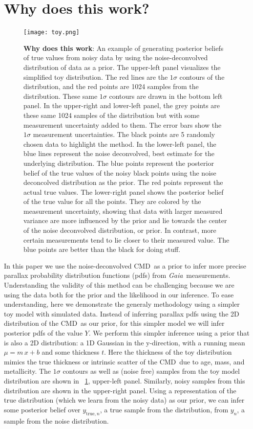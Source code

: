 \documentclass[modern]{aastex61}
\newcommand{\acronym}[1]{{\small{#1}}}
\newcommand{\project}[1]{\textsl{#1}}
\newcommand{\gaia}{\project{Gaia}}
\newcommand{\cmd}{\acronym{CMD}}
\newcommand{\true}{\mathrm{true}}
\begin{document}
\section{Why does this work?}
\begin{figure}
\centering
  \texttt{[image: toy.png]}
\caption{ {\bf Why does this work}: An example of generating posterior beliefs of true values from noisy data by using the noise-deconvolved distribution of data as a prior. The upper-left panel visualizes the simplified toy distribution. The red lines are the $1\sigma$ contours of the distribution, and the red points are 1024 samples from the distribution. These same $1\sigma$ contours are drawn in the bottom left panel. In the upper-right and lower-left panel, the grey points are these same 1024 samples of the distribution but with some measurement uncertainty added to them. The error bars show the $1\sigma$ measurement uncertainties. The black points are 5 randomly chosen data to highlight the method. In the lower-left panel, the blue lines represent the noise deconvolved, best estimate for the underlying distribution. The blue points represent the posterior belief of the true values of the noisy black points using the noise deconcolved distribution as the prior. The red points represent the actual true values. The lower-right panel shows the posterior belief of the true value for all the points. They are colored by the measurement uncertainty, showing that data with larger measured variance are more influenced by the prior and lie towards the center of the noise deconvolved distribution, or prior. In contrast, more certain measurements tend to lie closer to their measured value. The blue points are better than the black for doing stuff.}
\label{fig:toy}
\end{figure}

In this paper we use the noise-deconvolved \cmd\ as a prior to infer more precise parallax probability distribution functions (pdfs) from \gaia\ measurements.
Understanding the validity of this method can be challenging because we are using the data both for the prior and the likelihood in our inference.
To ease understanding, here we demonstrate the generaly methodology using a
simpler toy model with simulated data.
Instead of inferring parallax pdfs using the 2D distribution of the \cmd\ as our prior, for this simpler model we will infer posterior pdfs of the value $Y$.
We perform this simpler inference using a prior that is also a 2D distribution: a 1D Gaussian in the y-direction, with a running mean $\mu = m\,x + b$ and some thickness $t$.
Here the thickness of the toy distribution mimics the true thickness or intrinsic scatter of the \cmd\ due to age, mass, and metallicity.
The $1\sigma$ contours as well as (noise free) samples from the toy model distribution are shown in \figurename~\ref{fig:toy}, upper-left panel.
Similarly, noisy samples from this distribution are shown in the upper-right panel.
Using a representation of the true distribution (which we learn from the noisy data) as our prior, we can infer some posterior belief over $y_{\true,n}$, a true sample from the distribution, from $y_n$, a sample from the noise distribution.
\end{document}
